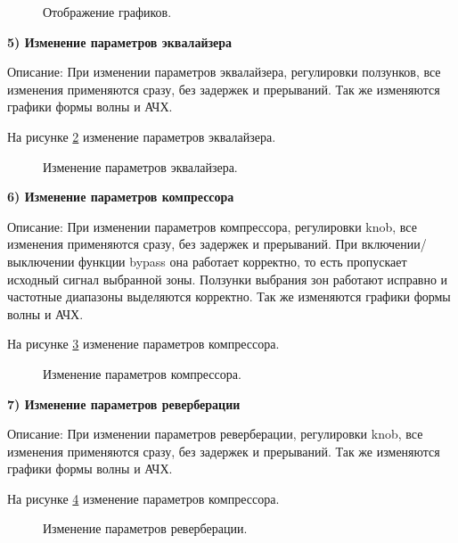 \begin{figure}[ht]
	\caption{Отображение графиков.}
	\label{Graph:image}
\end{figure}
\clearpage

\textbf{5) Изменение параметров эквалайзера}

Описание: При изменении параметров эквалайзера, регулировки ползунков, все изменения применяются сразу, без задержек и прерываний. Так же изменяются графики формы волны и АЧХ.

На рисунке \ref{EQParam:image} изменение параметров эквалайзера.

\begin{figure}[ht]
	\caption{Изменение параметров эквалайзера.}
	\label{EQParam:image}
\end{figure}

\clearpage
\textbf{6) Изменение параметров компрессора}

Описание: При изменении параметров компрессора, регулировки knob, все изменения применяются сразу, без задержек и прерываний. При включении/выключении функции bypass она работает корректно, то есть пропускает исходный сигнал выбранной зоны. Ползунки выбрания зон работают исправно и частотные диапазоны выделяются корректно. Так же изменяются графики формы волны и АЧХ.

На рисунке \ref{CompParam:image} изменение параметров компрессора.

\begin{figure}[ht]
	\caption{Изменение параметров компрессора.}
	\label{CompParam:image}
\end{figure}
\clearpage

\textbf{7) Изменение параметров реверберации}

Описание: При изменении параметров реверберации, регулировки knob, все изменения применяются сразу, без задержек и прерываний. Так же изменяются графики формы волны и АЧХ.

На рисунке \ref{ReverbParam:image} изменение параметров компрессора.

\begin{figure}[ht]
	\caption{Изменение параметров реверберации.}
	\label{ReverbParam:image}
\end{figure}
\clearpage

